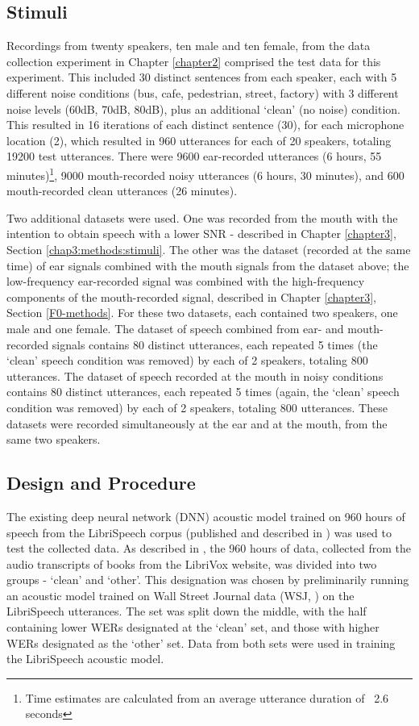\subsection{Stimuli}
\label{chap4:methods:stimuli}

Recordings from twenty speakers, ten male and ten female, from the data collection experiment in Chapter \ref{chapter2} comprised the test data for this experiment.  This included 30 distinct sentences from each speaker, each with 5 different noise conditions (bus, cafe, pedestrian, street, factory) with 3 different noise levels (60dB, 70dB, 80dB), plus an additional `clean' (no noise) condition.  This resulted in 16 iterations of each distinct sentence (30), for each microphone location (2), which resulted in 960 utterances for each of 20 speakers, totaling 19200 test utterances.  There were 9600 ear-recorded utterances (6 hours, 55 minutes)\footnote{Time estimates are calculated from an average utterance duration of ~2.6 seconds}, 9000 mouth-recorded noisy utterances (6 hours, 30 minutes), and 600 mouth-recorded clean utterances (26 minutes).

Two additional datasets were used.  One was recorded from the mouth with the intention to obtain speech with a lower SNR - described in Chapter \ref{chapter3}, Section \ref{chap3:methods:stimuli}.  The other was the dataset (recorded at the same time) of ear signals combined with the mouth signals from the dataset above; the low-frequency ear-recorded signal was combined with the high-frequency components of the mouth-recorded signal, described in Chapter \ref{chapter3}, Section \ref{F0-methods}.
For these two datasets, each contained two speakers, one male and one female.  The dataset of speech combined from ear- and mouth-recorded signals contains 80 distinct utterances, each repeated 5 times (the `clean' speech condition was removed) by each of 2 speakers, totaling 800 utterances.  The dataset of speech recorded at the mouth in noisy conditions contains 80 distinct utterances, each repeated 5 times (again, the `clean' speech condition was removed) by each of 2 speakers, totaling 800 utterances.  These datasets were recorded simultaneously at the ear and at the mouth, from the same two speakers.

\subsection{Design and Procedure}
\label{chap4:methods:design}

The existing deep neural network (DNN) acoustic model trained on 960 hours of speech from the LibriSpeech corpus (published and described in \cite{panayotov:15}) was used to test the collected data.  As described in \cite{panayotov:15}, the 960 hours of data, collected from the audio transcripts of books from the LibriVox website, was divided into two groups - `clean' and `other'.  This designation was chosen by preliminarily running an acoustic model trained on Wall Street Journal data (WSJ, \cite{paul:92}) on the LibriSpeech utterances. The set was split down the middle, with the half containing lower WERs designated at the `clean' set, and those with higher WERs designated as the `other' set.  Data from both sets were used in training the LibriSpeech acoustic model.

